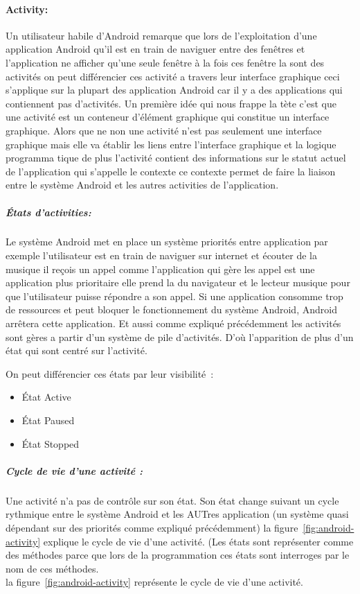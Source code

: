 \paragraph{Activity:}

Un utilisateur habile d'Android remarque que lors de l'exploitation d'une
application Android qu'il est en train de naviguer entre des fenêtres et
l'application ne afficher qu'une seule fenêtre à la fois ces fenêtre la sont
des activités on peut différencier ces activité a travers leur interface
graphique ceci s'applique sur la plupart des application Android car il y a
des applications qui contiennent pas d'activités. Un première idée qui nous
frappe la tète c'est que une activité est un conteneur d'élément graphique qui
constitue un interface graphique. Alors que ne non une activité n'est pas
seulement une interface graphique mais elle va établir les liens entre
l'interface graphique et la logique programma tique de plus l'activité
contient des informations sur le statut actuel de l'application qui s'appelle le
contexte ce contexte permet de faire la liaison entre le système Android et les
autres activities de l'application.

\subparagraph{États d'activities:}

Le système Android met en place un système priorités entre application
par exemple l'utilisateur est en train de naviguer sur internet et écouter
de la musique il reçois un appel comme l'application qui gère les appel est
une application plus prioritaire elle prend la du navigateur et le lecteur
musique pour que l'utilisateur puisse répondre a son appel. Si une application
consomme trop de ressources et peut bloquer le fonctionnement du système Android,
Android arrêtera cette application. Et aussi comme expliqué précédemment
les activités sont gères a partir d'un système de pile d'activités.
D'où l'apparition de plus d'un état qui sont centré sur l'activité.

On peut différencier ces états par leur visibilité :
\begin{itemize}
 \item État Active
 \item État Paused
 \item État Stopped
\end{itemize}

\subparagraph{Cycle de vie d'une activité :}

Une activité n'a pas de contrôle sur son état.
Son état change suivant un cycle rythmique entre le système Android et les
AUTres application (un système quasi dépendant sur des priorités comme expliqué
précédemment) la figure~\ref{fig:android-activity} explique le cycle de vie
d'une activité. (Les états sont représenter comme des méthodes parce que lors de
la programmation ces états sont interroges par le nom de ces méthodes.\\
la figure~\ref{fig:android-activity} représente le cycle de vie d'une activité.

